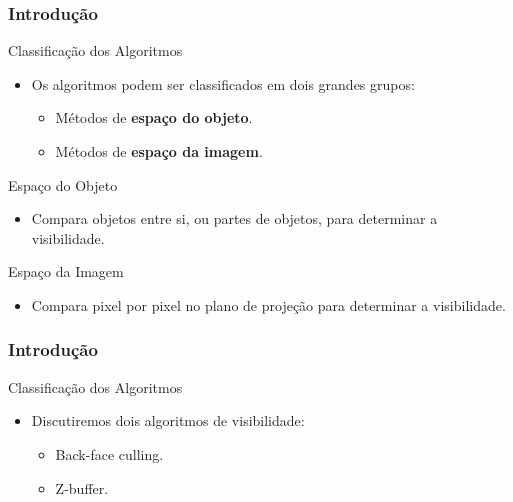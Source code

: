 \documentclass{beamer}
\begin{document}
\begin{frame}
\frametitle{Introdução}

		\begin{block}{Classificação dos Algoritmos}
			\begin{itemize}
				\item Os algoritmos podem ser classificados em dois grandes grupos:
					\begin{itemize}
						\item Métodos de \textbf{espaço do objeto}.
						\item Métodos de \textbf{espaço da imagem}.
					\end{itemize}
			\end{itemize} 
		\end{block}
		
		\begin{block}{Espaço do Objeto}
			\begin{itemize}
				\item Compara objetos entre si, ou partes de objetos, para determinar a visibilidade.
			\end{itemize}
		\end{block}

		\begin{block}{Espaço da Imagem}
			\begin{itemize}
				\item Compara pixel por pixel no plano de projeção para determinar a visibilidade.
			\end{itemize}
		\end{block}
\end{frame}

\begin{frame}
\frametitle{Introdução}

		\begin{block}{Classificação dos Algoritmos}
			\begin{itemize}
				\item Discutiremos dois algoritmos de visibilidade:
					\begin{itemize}
						\item Back-face culling.
						\item Z-buffer.
					\end{itemize}
			\end{itemize} 
		\end{block}
\end{frame}
\end{document}
